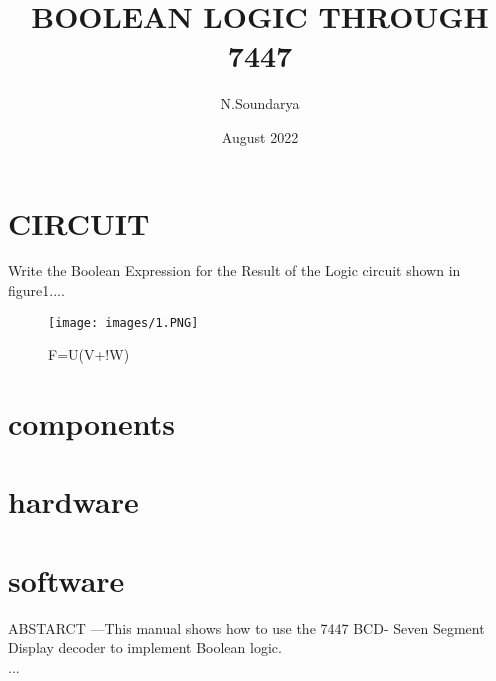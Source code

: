 \documentclass{article}
\title{BOOLEAN LOGIC THROUGH 7447}
\author{N.Soundarya}
\date{August 2022}
\begin{document}
\maketitle

\section{CIRCUIT}

Write the Boolean Expression for the Result of the Logic circuit shown in figure1....\\
\begin{figure}
    \centering
    \texttt{[image: images/1.PNG]}
    \caption{F=U(V+!W)}
    \label{fig:circuit}
\end{figure}
\section{components}
\section{hardware}
\section{software}
ABSTARCT —This manual shows how to use the 7447 BCD-
Seven Segment Display decoder to implement Boolean logic.\\
...\\
\end{document}
